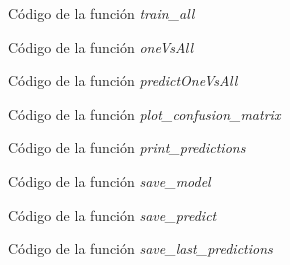 \documentclass[6pt]{AiTex}
\begin{document}
\begin{figure}[H]
    \centering
    
    \caption{Código de la función \textit{train\_all}}
    \label{fig:train_all}
\end{figure}

\begin{figure}[H]
    \centering
    
    \caption{Código de la función \textit{oneVsAll}}
    \label{fig:oneVsAll}
\end{figure}

\begin{figure}[H]
    \centering
    
    \caption{Código de la función \textit{predictOneVsAll}}
    \label{fig:predictOneVsAll}
\end{figure}

\begin{figure}[H]
    \centering
    
    \caption{Código de la función \textit{plot\_confusion\_matrix}}
    \label{fig:plot_confusion_matrix}
\end{figure}


\begin{figure}[H]
    \centering
    
    \caption{Código de la función \textit{print\_predictions}}
    \label{fig:print_predictions}
\end{figure}

\begin{figure}[H]
    \centering
    
    \caption{Código de la función \textit{save\_model}}
    \label{fig:save_model}
\end{figure}

\begin{figure}[H]
    \centering
    
    \caption{Código de la función \textit{save\_predict}}
    \label{fig:save_predict}
\end{figure}

\begin{figure}[H]
    \centering
    
    \caption{Código de la función \textit{save\_last\_predictions}}
    \label{fig:save_last_prediction}
\end{figure}
\end{document}
